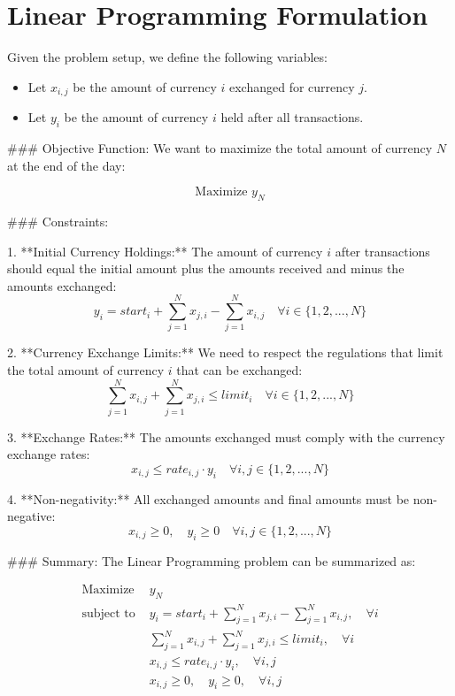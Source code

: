 \documentclass{article}
\begin{document}
\section*{Linear Programming Formulation}

Given the problem setup, we define the following variables:

\begin{itemize}
    \item Let \( x_{i,j} \) be the amount of currency \( i \) exchanged for currency \( j \).
    \item Let \( y_i \) be the amount of currency \( i \) held after all transactions.
\end{itemize}

### Objective Function:
We want to maximize the total amount of currency \( N \) at the end of the day:

\[
\text{Maximize } y_N
\]

### Constraints:

1. **Initial Currency Holdings:**
   The amount of currency \( i \) after transactions should equal the initial amount plus the amounts received and minus the amounts exchanged:
   \[
   y_i = start_i + \sum_{j=1}^{N} x_{j,i} - \sum_{j=1}^{N} x_{i,j} \quad \forall i \in \{1, 2, ..., N\}
   \]

2. **Currency Exchange Limits:**
   We need to respect the regulations that limit the total amount of currency \( i \) that can be exchanged:
   \[
   \sum_{j=1}^{N} x_{i,j} + \sum_{j=1}^{N} x_{j,i} \leq limit_i \quad \forall i \in \{1, 2, ..., N\}
   \]

3. **Exchange Rates:**
   The amounts exchanged must comply with the currency exchange rates:
   \[
   x_{i,j} \leq rate_{i,j} \cdot y_i \quad \forall i, j \in \{1, 2, ..., N\}
   \]

4. **Non-negativity:**
   All exchanged amounts and final amounts must be non-negative:
   \[
   x_{i,j} \geq 0, \quad y_i \geq 0 \quad \forall i, j \in \{1, 2, ..., N\}
   \]

### Summary:
The Linear Programming problem can be summarized as:

\[
\begin{align*}
\text{Maximize } & y_N \\
\text{subject to } & y_i = start_i + \sum_{j=1}^{N} x_{j,i} - \sum_{j=1}^{N} x_{i,j}, \quad \forall i \\
& \sum_{j=1}^{N} x_{i,j} + \sum_{j=1}^{N} x_{j,i} \leq limit_i, \quad \forall i \\
& x_{i,j} \leq rate_{i,j} \cdot y_i, \quad \forall i, j \\
& x_{i,j} \geq 0, \quad y_i \geq 0, \quad \forall i, j 
\end{align*}
\]
\end{document}
